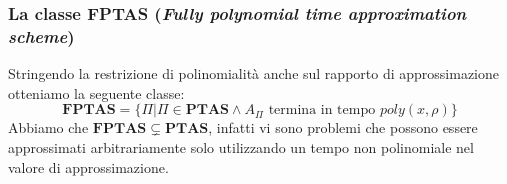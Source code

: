 \subsubsection{La classe {\bf FPTAS} ({\it Fully polynomial time approximation
scheme})}
Stringendo la restrizione di polinomialità anche sul rapporto di approssimazione 
otteniamo la seguente classe: 
$$
\mathbf{FPTAS} =  \{ \Pi | \Pi \in \mathbf{PTAS} \land A_{\Pi} \text{ termina in tempo } poly(x, \rho)\}
$$
Abbiamo che  $\mathbf{FPTAS} \subsetneq \mathbf{PTAS}$, infatti vi sono problemi 
che possono essere approssimati arbitrariamente solo utilizzando un tempo non 
polinomiale nel valore di approssimazione. 


\begin{figure}[h]
  \centering




\begin{tikzpicture}[x=0.75pt,y=0.75pt,yscale=-1,xscale=1]


\end{tikzpicture}
\end{figure}
